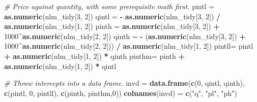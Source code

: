 \documentclass[]{article}
\newenvironment{Shaded}{\begin{snugshade}}{\end{snugshade}}
\newcommand{\KeywordTok}[1]{\textcolor[rgb]{0.13,0.29,0.53}{\textbf{#1}}}
\newcommand{\DecValTok}[1]{\textcolor[rgb]{0.00,0.00,0.81}{#1}}
\newcommand{\StringTok}[1]{\textcolor[rgb]{0.31,0.60,0.02}{#1}}
\newcommand{\CommentTok}[1]{\textcolor[rgb]{0.56,0.35,0.01}{\textit{#1}}}
\newcommand{\OperatorTok}[1]{\textcolor[rgb]{0.81,0.36,0.00}{\textbf{#1}}}
\newcommand{\NormalTok}[1]{#1}
\begin{document}
\begin{Shaded}
\begin{Highlighting}[]
\CommentTok{# Price against quantity, with some prerequisite math first.}
\NormalTok{pintl =}\StringTok{ }\KeywordTok{as.numeric}\NormalTok{(nlm_tidy[}\DecValTok{3}\NormalTok{, }\DecValTok{2}\NormalTok{])}
\NormalTok{qintl =}\StringTok{ }\OperatorTok{-}\StringTok{ }\KeywordTok{as.numeric}\NormalTok{(nlm_tidy[}\DecValTok{3}\NormalTok{, }\DecValTok{2}\NormalTok{]) }\OperatorTok{/}\StringTok{ }\KeywordTok{as.numeric}\NormalTok{(nlm_tidy[}\DecValTok{1}\NormalTok{, }\DecValTok{2}\NormalTok{])}
\NormalTok{pinth =}\StringTok{ }\KeywordTok{as.numeric}\NormalTok{(nlm_tidy[}\DecValTok{3}\NormalTok{, }\DecValTok{2}\NormalTok{]) }\OperatorTok{+}\StringTok{ }\DecValTok{1000}\OperatorTok{^}\KeywordTok{as.numeric}\NormalTok{(nlm_tidy[}\DecValTok{2}\NormalTok{, }\DecValTok{2}\NormalTok{])}
\NormalTok{qinth =}\StringTok{ }\OperatorTok{-}\StringTok{ }\NormalTok{(}\KeywordTok{as.numeric}\NormalTok{(nlm_tidy[}\DecValTok{3}\NormalTok{, }\DecValTok{2}\NormalTok{]) }\OperatorTok{+}\StringTok{ }\DecValTok{1000}\OperatorTok{^}\KeywordTok{as.numeric}\NormalTok{(nlm_tidy[}\DecValTok{2}\NormalTok{, }\DecValTok{2}\NormalTok{])) }\OperatorTok{/}\StringTok{ }\KeywordTok{as.numeric}\NormalTok{(nlm_tidy[}\DecValTok{1}\NormalTok{, }\DecValTok{2}\NormalTok{])}
\NormalTok{pintll=}\StringTok{ }\NormalTok{pintl }\OperatorTok{+}\StringTok{ }\KeywordTok{as.numeric}\NormalTok{(nlm_tidy[}\DecValTok{1}\NormalTok{, }\DecValTok{2}\NormalTok{]) }\OperatorTok{*}\StringTok{ }\NormalTok{qinth}
\NormalTok{pinthm=}\StringTok{ }\NormalTok{pinth }\OperatorTok{+}\StringTok{ }\KeywordTok{as.numeric}\NormalTok{(nlm_tidy[}\DecValTok{1}\NormalTok{, }\DecValTok{2}\NormalTok{]) }\OperatorTok{*}\StringTok{ }\NormalTok{qintl}

\CommentTok{# Throw intercepts into a data frame.}
\NormalTok{invd  =}\StringTok{ }\KeywordTok{data.frame}\NormalTok{(}\KeywordTok{c}\NormalTok{(}\DecValTok{0}\NormalTok{, qintl, qinth), }\KeywordTok{c}\NormalTok{(pintl, }\DecValTok{0}\NormalTok{, pintll), }\KeywordTok{c}\NormalTok{(pinth, pinthm,}\DecValTok{0}\NormalTok{)) }
\KeywordTok{colnames}\NormalTok{(invd) =}\StringTok{ }\KeywordTok{c}\NormalTok{(}\StringTok{"q"}\NormalTok{, }\StringTok{"pl"}\NormalTok{, }\StringTok{"ph"}\NormalTok{)}


\end{Highlighting}
\end{Shaded}
\end{document}
